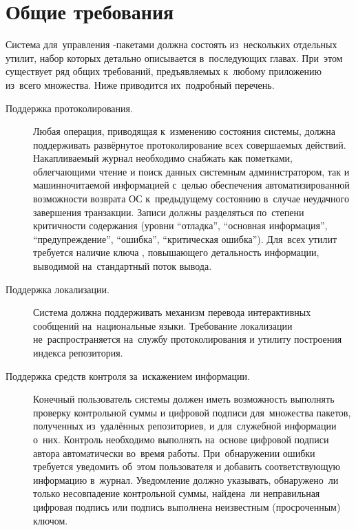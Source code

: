 
\section{Общие требования}

Система для~управления -пакетами должна состоять из~нескольких отдельных утилит,
набор которых детально описывается в~последующих главах.
При~этом существует ряд общих требований, предъявляемых к~любому приложению из~всего множества.
Ниже приводится их~подробный перечень.

\begin{description}

\item[Поддержка протоколирования.]
Любая операция, приводящая к~изменению состояния системы, 
должна поддерживать развёрнутое протоколирование всех совершаемых  действий.
Накапливаемый журнал необходимо снабжать как пометками, облегчающими чтение и поиск данных системным администратором,
так и машинночитаемой информацией с~целью обеспечения автоматизированной возможности 
возврата ОС к~предыдущему состоянию в~случае неудачного завершения транзакции. 
Записи должны разделяться по~степени критичности содержания 
(уровни ``отладка'', ``основная информация'', ``предупреждение'', ``ошибка'', ``критическая ошибка'').
Для~всех утилит требуется наличие ключа ,
 повышающего детальность информации,
выводимой на~стандартный поток вывода.

\item [Поддержка локализации.]
Система должна поддерживать механизм перевода интерактивных сообщений на~национальные языки.
Требование локализации не~распространяется на~службу протоколирования и утилиту построения индекса репозитория.

\item[Поддержка средств контроля за~искажением информации.]
Конечный пользователь системы должен иметь возможность выполнять проверку контрольной суммы и цифровой подписи 
для~множества пакетов, полученных из~удалённых репозиториев, и для~служебной информации о~них.
Контроль необходимо выполнять на~основе цифровой подписи   автора  автоматически  во~время работы.
При~обнаружении ошибки требуется уведомить об~этом пользователя и добавить соответствующую информацию в~журнал.
Уведомление должно указывать, обнаружено~ли только несовпадение контрольной суммы, 
найдена~ли неправильная цифровая подпись или подпись выполнена неизвестным (просроченным) ключом.


\end{description}
